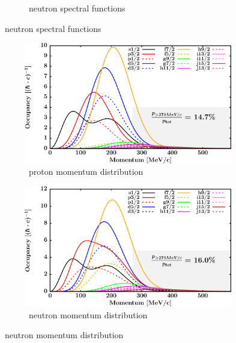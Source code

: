 \begin{figure}[hbtp]
\begin{subfigure}[b]{0.45\textwidth}
        \caption{\niFour\ neutron spectral functions}
        \label{DOMFitData_ni64_neutron_spectralFunctions}
    \end{subfigure}
\end{figure}
\afterpage{\clearpage}
\begin{figure}[hbtp]
    \captionsetup[subfigure]{labelformat=empty}
    \centering
    \begin{subfigure}[b]{0.45\textwidth}
        \centering
        \includegraphics[width=\linewidth]{figures/ni64_protonLJMomentumDistIntegral.png}
        \caption{\niFour\ proton momentum distribution}
        \label{DOMFitData_ni64_proton_momentumDist}
    \end{subfigure}\hspace{6pt}
    \begin{subfigure}[b]{0.45\textwidth}
        \centering
        \includegraphics[width=\linewidth]{figures/ni64_neutronLJMomentumDistIntegral.png}
        \caption{\niFour\ neutron momentum distribution}
        \label{DOMFitData_ni64_neutron_momentumDist}
    \end{subfigure}\vspace{0.3in}

\end{figure}
